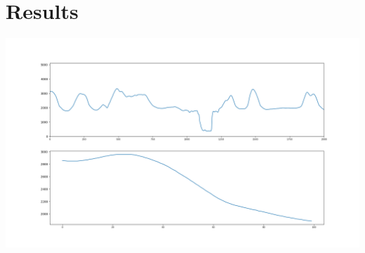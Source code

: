 \documentclass[]{article}
\begin{document}
	\section*{Results}
		\begin{center}
			\includegraphics[width=\textwidth]{./images/1.png}
		\end{center}
\end{document}

